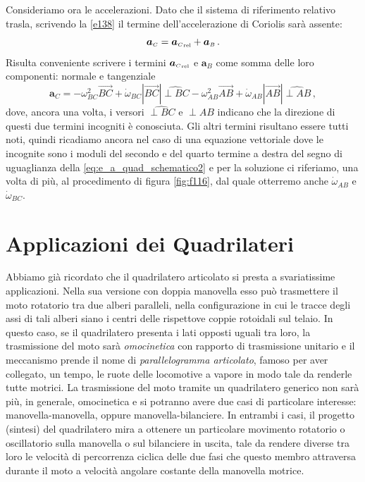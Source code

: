 \noindent Consideriamo ora le accelerazioni. Dato che il sistema di riferimento relativo trasla, scrivendo la \ref{e138} il termine dell'accelerazione di Coriolis sar\`a assente:
\begin{equation}
{{\bm a}_{\scriptscriptstyle{C}}}=
{{\bm a}_{\scriptscriptstyle{C}}}_{\scriptscriptstyle{{\rm rel}}}+
{{\bm a}_{\scriptscriptstyle{B}}}\,.
\label{eq:e_a_quad_schematico}
\end{equation}
\noindent Risulta conveniente scrivere i termini
${{\bm a}_{\scriptscriptstyle{C}}}_{\scriptscriptstyle{{\rm rel}}}$ e 
${{\bm a}_{\scriptscriptstyle{B}}}$ 
come somma delle loro
componenti: normale e tangenziale
\begin{equation}
{{\bm a}_{\scriptscriptstyle{C}}}=
-\omega^2_{\scriptscriptstyle{BC}} \overrightarrow{BC} + {\dot{\omega}_{\scriptscriptstyle{BC}}}|\overrightarrow{BC}|\widehat{{\perp{BC}}}
-\omega^2_{\scriptscriptstyle{AB}} \overrightarrow{AB} + {\dot{\omega}_{\scriptscriptstyle{AB}}}|\overrightarrow{AB}|\widehat{{\perp{AB}}}\,,
\label{eq:e_a_quad_schematico2}
\end{equation}
\noindent dove, ancora una volta, i versori
$\widehat{{\perp{BC}}}$ e $\widehat{{\perp{AB}}}$ indicano che la direzione
di questi due termini incogniti \`e conosciuta.
Gli altri termini risultano essere tutti noti, quindi
ricadiamo ancora nel caso di una equazione vettoriale dove le incognite sono
i moduli del secondo e del quarto termine a destra del segno di uguaglianza della
\ref{eq:e_a_quad_schematico2} e per la soluzione ci riferiamo, una volta di pi\`u,
al procedimento di figura \ref{fig:f116}, dal quale
otterremo anche
${\dot{\omega}}_{\scriptscriptstyle{AB}}$ e ${\dot{\omega}}_{\scriptscriptstyle{BC}}$.

\section{Applicazioni dei Quadrilateri} \label{q_squilibrio}
\noindent Abbiamo gi\`a ricordato che il quadrilatero articolato si presta a
svariatissime applicazioni. Nella sua versione con doppia manovella esso
pu\`o trasmettere il moto rotatorio
tra due alberi paralleli, nella configurazione in cui
le tracce degli assi di tali alberi siano i centri delle
rispettove coppie rotoidali sul telaio. In questo caso,
se il quadrilatero presenta i lati opposti uguali tra loro, la trasmissione
del moto sar\`a {\em omocinetica} con
rapporto di trasmissione unitario e il meccanismo
prende il nome di {\em parallelogramma articolato},
famoso per aver collegato, un tempo, le ruote delle locomotive a vapore in
modo tale da renderle tutte motrici.
La trasmissione del moto tramite un quadrilatero generico non sar\`a pi\`u,
in generale, omocinetica
e si potranno avere due casi di particolare interesse: manovella-manovella, oppure
manovella-bilanciere. In entrambi i casi, il progetto (sintesi) del quadrilatero
mira a ottenere un particolare movimento rotatorio o oscillatorio 
sulla manovella o sul bilanciere in uscita, tale da rendere diverse tra loro
 le velocit\`a di
percorrenza ciclica delle due fasi che questo membro attraversa durante il moto
a velocit\`a angolare costante della manovella motrice.

